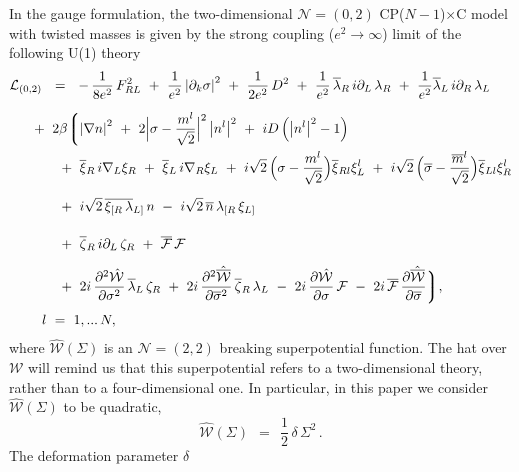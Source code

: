 \documentclass[12pt]{article}
\newcommand{\ntwot}{${\mathcal N}= \left(2,2\right) $ }
\newcommand{\ntwoo}{${\mathcal N}= \left(0,2\right) $ }
\newcommand{\p}{\partial}
\newcommand{\wt}{\widetilde}
\newcommand{\ov}{\overline}
\newcommand{\mc}[1]{\mathcal{#1}}
\newcommand{\bxir}{\ov{\xi}{}_R}
\newcommand{\bxil}{\ov{\xi}{}_L}
\newcommand{\xir}{\xi_R}
\newcommand{\xil}{\xi_L}
\newcommand{\bzr}{\ov{\zeta}{}_R}
\newcommand{\zr}{\zeta_R}
\newcommand{\nbar}{\ov{n}}
\newcommand{\CPC}{CP($N-1$)$\times$C }
\newcommand{\lar}{\lambda_R}
\newcommand{\lal}{\lambda_L}
\newcommand{\blar}{\ov{\lambda}{}_R}
\newcommand{\blal}{\ov{\lambda}{}_L}
\newcommand{\tgamma}{\wt{\gamma}}
\newcommand{\ff}{\mc{F}}
\newcommand{\bff}{\ov{\mc{F}}}
\begin{document}
In the gauge formulation, the two-dimensional
\ntwoo \CPC  model with twisted
masses  is given by the strong coupling ($ e^2\to\infty $) limit  of
the following U(1) theory
\begin{align}
\label{sigma_full}
% 
\notag
 	\mc{L}_\text{(0,2)} & ~~=~~
	-\,\frac{1}{8e^2}\,F_{RL}^2  ~+~ \frac{1}{e^2} \left|\p_k \sigma\right|^2 
	~+~ \frac{1}{2e^2}\, D^2
	~+~ \frac{1}{e^2}\, \blar\, i\p_L\, \lar  ~+~  \frac{1}{e^2} \blal\, i\p_R\, \lal
	\\[2mm]
%
\notag
	&
	\hspace{-0.4cm}
	~+~ 2\beta \biggl \lgroup
	\left| \nabla n \right|^2  ~+~ 2 \Bigl| \sigma - 
	\frac{m^l}{\sqrt{2}} \Bigr|^2 \left| n^l \right|^2
	~+~ iD \left( \left|n^l \right|^2 - 1 \right)
	\\
%
\notag
	&
	\hspace{-0.4cm}\phantom{2\beta\lgroup}
	~+~ \bxir\, i\nabla_L \xir  ~+~ \bxil\, i\nabla_R \xil ~+~
	i\sqrt{2}\, \Bigl( \sigma - \frac{m^l}{\sqrt{2}} \Bigr) \ov{\xi}{}_{Rl} \xi_L^l
	~+~ i\sqrt{2}\, \Bigl( \ov{\sigma} - \frac{\ov{m}{}^l}{\sqrt{2}} \Bigr) \ov{\xi}{}_{Ll} \xi_R^l
	\\[2mm]
%
	&
	\hspace{-0.4cm}\phantom{2\beta\lgroup}
	~+~ i\sqrt{2}\, \ov{\xi_{[R}\, \lambda}{}_{L]}\, n
	~-~ i\sqrt{2}\, \nbar\,  \lambda_{[R}\, \xi_{L]}
	\\[2mm]
%
\notag
	&
	\hspace{-0.4cm}\phantom{2\beta\lgroup}
	~+~ \bzr\, i\p_L\, \zr   ~+~   \bff\, \ff
	\\
%
\notag
	&
	\hspace{-0.4cm}\phantom{2\beta\lgroup}
	~+~ 2i\, \frac{\p^2 \hat{\mc{W}}}{\p \sigma^2}\, \blal\, \zr
	~+~ 2i\, \frac{\p^2 \hat{\ov{\mc{W}}}}{\p \ov{\sigma}{}^2}\, \bzr\, \lal
	~-~ 2i\, \frac{\p \hat{\mc{W}}}{\p \sigma}\, \ff
	~-~ 2i\, \bff\, \frac{\p \hat{\ov{\mc{W}}}}{\p \ov{\sigma}}
	\biggr\rgroup ,
	\\[1mm]
%
\notag
	&
	l~=~1,...\,N,
\end{align}
	where $ \hat{\mc{W}}(\Sigma) $ is an   \ntwot breaking superpotential 
	function. The hat over ${\mc{W}}$ will remind us that
	this superpotential refers to a two-dimensional theory, rather than to a four-dimensional one.
	In particular, in this paper we consider
$ \hat{\mc{W}}(\Sigma) $ to be   quadratic,
\[
	\hat{\mc{W}}(\Sigma) ~~=~~ \frac{1}{2}\, \delta\, \Sigma^2\,.
\]
The deformation parameter $\delta$ 
\end{document}

